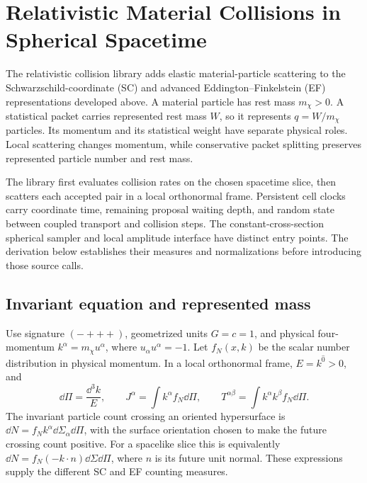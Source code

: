 \section{Relativistic Material Collisions in Spherical Spacetime}
\hypertarget{sec:relativistic-material-collisions}{}
\label{sec:relativistic-material-collisions}

The relativistic collision library adds elastic material-particle scattering
to the Schwarzschild-coordinate (SC) and advanced Eddington--Finkelstein (EF)
representations developed above. A material particle has rest mass
\(m_\chi>0\). A statistical packet carries represented rest mass \(W\), so
it represents \(q=W/m_\chi\) particles. Its momentum and its statistical
weight have separate physical roles. Local scattering changes momentum,
while conservative packet splitting preserves represented particle number
and rest mass.

The library first evaluates collision rates on the chosen spacetime slice,
then scatters each accepted pair in a local orthonormal frame. Persistent cell
clocks carry coordinate time, remaining proposal waiting depth, and random
state between coupled transport and collision steps. The constant-cross-section spherical sampler
and local amplitude interface have distinct entry points. The derivation
below establishes their measures and normalizations before introducing those
source calls.

\subsection{Invariant equation and represented mass}

Use signature \((-+++)\), geometrized units \(G=c=1\), and physical
four-momentum \(k^\alpha=m_\chi u^\alpha\), where
\(u_\alpha u^\alpha=-1\). Let \(f_N(x,k)\) be the scalar number
distribution in physical momentum. In a local orthonormal frame,
\(E=k^{\hat0}>0\), and
\[
 \dd\Pi=\frac{\dd^3 k}{E},\qquad
 J^\alpha=\int k^\alpha f_N\dd\Pi,\qquad
 T^{\alpha\beta}=\int k^\alpha k^\beta f_N\dd\Pi.
 \tag{REB1}
\]
The invariant particle count crossing an oriented hypersurface is
\(\dd N=f_N k^\alpha\dd\Sigma_\alpha\dd\Pi\), with the surface
orientation chosen to make the future crossing count positive.
For a spacelike slice this is equivalently
\(\dd N=f_N(-k\cdot n)\dd\Sigma\dd\Pi\), where \(n\) is its
future unit normal. These expressions supply the different SC and EF
counting measures.


